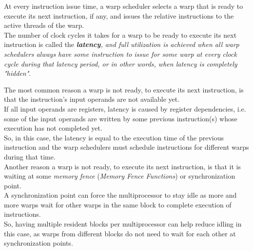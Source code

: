 	At every instruction issue time, a warp scheduler selects a warp that is ready to execute its next instruction, if any, and issues the relative instructions to the active threads of the warp.\\
	The number of clock cycles it takes for a warp to be ready to execute its next instruction is called the \textit{\textbf{latency}, and full utilization is achieved when all warp schedulers always have some instruction to issue for some warp at every clock cycle during that latency period, or in other words, when latency is completely "hidden"}\cite{perfoptimize,understandlatency}. 
	
	The most common reason a warp is not ready, to execute its next instruction, is that the instruction's input operands are not available yet.\\
	If all input operands are registers, latency is caused by register dependencies, i.e. some of the input operands are written by some previous instruction(s) whose execution has not completed yet.\\ 
	So, in this case, the latency is equal to the execution time of the previous instruction and the warp schedulers must schedule instructions for different warps during that time.\\

	Another reason a warp is not ready, to execute its next instruction, is that it is waiting at some \textit{memory fence} (\textit{Memory Fence Functions}) or synchronization point.\\ A synchronization point can force the multiprocessor to stay idle as more and more warps wait for other warps in the same block to complete execution of instructions.\\
	So, having multiple resident blocks per multiprocessor can help reduce idling in this case, as warps from different blocks do not need to wait for each other at synchronization points.
	

